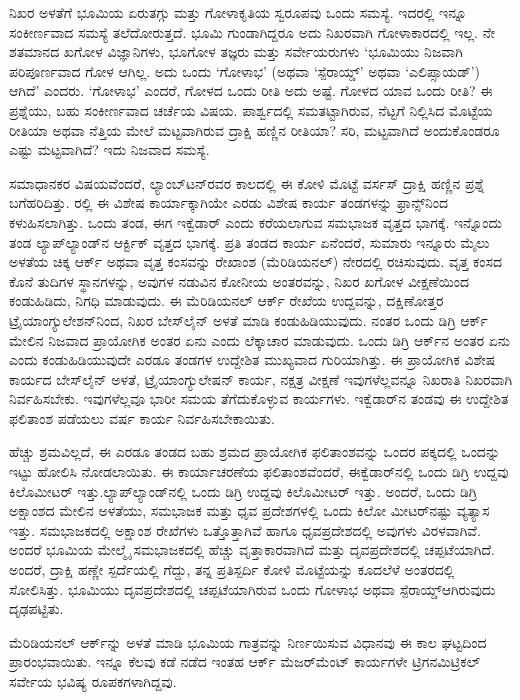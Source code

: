 ನಿಖರ ಅಳತೆಗೆ ಭೂಮಿಯ ಏರುತಗ್ಗು ಮತ್ತು ಗೋಳಾಕೃತಿಯ ಸ್ವರೂಪವು ಒಂದು ಸಮಸ್ಯೆ. ಇದರಲ್ಲಿ ಇನ್ನೂ ಸಂಕೀರ್ಣವಾದ ಸಮಸ್ಯೆ ತಲೆದೋರುತ್ತದೆ. ಭೂಮಿ ಗುಂಡಾಗಿದ್ದರೂ ಅದು ನಿಖರವಾಗಿ ಗೋಳಾಕಾರದಲ್ಲಿ ಇಲ್ಲ. ನೇ ಶತಮಾನದ ಖಗೋಳ ವಿಜ್ಞಾನಿಗಳು, ಭೂಗೋಳ ತಜ್ಞರು ಮತ್ತು ಸರ್ವೇಯರುಗಳು ‘ಭೂಮಿಯು ನಿಜವಾಗಿ ಪರಿಪೂರ್ಣವಾದ ಗೋಳ ಆಗಿಲ್ಲ. ಅದು ಒಂದು ‘ಗೋಳಾಭ’ (ಅಥವಾ ‘ಸ್ಪೆರಾಯ್ಡ್​’ ಅಥವಾ ‘ಎಲಿಪ್ಸಾಯಡ್​’) ಆಗಿದೆ’ ಎಂದರು. ‘ಗೋಳಾಭ’ ಎಂದರೆ, ಗೋಳದ ಒಂದು ರೀತಿ ಅದು ಅಷ್ಟೆ. ಗೋಳದ ಯಾವ ಒಂದು ರೀತಿ? ಈ ಪ್ರಶ್ನೆಯು, ಬಹು ಸಂಕೀರ್ಣವಾದ ಚರ್ಚೆಯ ವಿಷಯ. ಪಾರ್ಶ್ವದಲ್ಲಿ ಸಮತಟ್ಟಾಗಿರುವ, ನೆಟ್ಟಗೆ ನಿಲ್ಲಿಸಿದ ಮೊಟ್ಟೆಯ ರೀತಿಯಾ ಅಥವಾ ನೆತ್ತಿಯ ಮೇಲೆ ಮಟ್ಟವಾಗಿರುವ ದ್ರಾಕ್ಷಿ ಹಣ್ಣಿನ ರೀತಿಯಾ? ಸರಿ, ಮಟ್ಟವಾಗಿದೆ ಅಂದುಕೊಂಡರೂ ಎಷ್ಟು ಮಟ್ಟವಾಗಿದೆ? ಇದು ನಿಜವಾದ ಸಮಸ್ಯೆ.

ಸಮಾಧಾನಕರ ವಿಷಯವೆಂದರೆ, ಲ್ಯಾಂಬ್​ಟನ್​ರವರ ಕಾಲದಲ್ಲಿ ಈ ಕೋಳಿ ಮೊಟ್ಟೆ ವರ್ಸಸ್​ ದ್ರಾಕ್ಷಿ ಹಣ್ಣಿನ ಪ್ರಶ್ನೆ ಬಗೆಹರಿದಿತ್ತು. ರಲ್ಲಿ ಈ ವಿಶೇಷ ಕಾರ್ಯಾಕ್ಕಾಗಿಯೇ ಎರಡು ವಿಶೇಷ ಕಾರ್ಯ ತಂಡಗಳನ್ನು ಫ್ರಾನ್ಸ್​ನಿಂದ ಕಳುಹಿಸಲಾಗಿತ್ತು. ಒಂದು ತಂಡ, ಈಗ ಇಕ್ವೆಡಾರ್​ ಎಂದು ಕರೆಯಲಾಗುವ ಸಮಭಾಜಕ ವೃತ್ತದ ಭಾಗಕ್ಕೆ. ಇನ್ನೊಂದು ತಂಡ ಲ್ಯಾಪ್​ಲ್ಯಾಂಡ್​ನ ಆರ್ಕ್ಟಿಕ್​ ವೃತ್ತದ ಭಾಗಕ್ಕೆ. ಪ್ರತಿ ತಂಡದ ಕಾರ್ಯ ಏನೆಂದರೆ, ಸುಮಾರು ಇನ್ನೂರು ಮೈಲು ಅಳತೆಯ ಚಿಕ್ಕ ಆರ್ಕ್ ಅಥವಾ ವೃತ್ತ ಕಂಸವನ್ನು ರೇಖಾಂಶ (ಮೆರಿಡಿಯನಲ್​) ನೇರದಲ್ಲಿ ರಚಿಸುವುದು. ವೃತ್ತ ಕಂಸದ ಕೊನೆ ತುದಿಗಳ ಸ್ಥಾನಗಳನ್ನು, ಅವುಗಳ ನಡುವಿನ ಕೋನೀಯ ಅಂತರವನ್ನು, ನಿಖರ ಖಗೋಳ ವೀಕ್ಷಣೆಯಿಂದ ಕಂಡುಹಿಡಿದು, ನಿಗಧಿ ಮಾಡುವುದು. ಈ ಮೆರಿಡಿಯನಲ್​ ಆರ್ಕ್ ರೇಖೆಯ ಉದ್ದವನ್ನು, ದಕ್ಷಿಣೋತ್ತರ ಟ್ರೈಯಾಂಗ್ಯುಲೇಶನ್​ನಿಂದ, ನಿಖರ ಬೇಸ್​ಲೈನ್​ ಅಳತೆ ಮಾಡಿ ಕಂಡುಹಿಡಿಯುವುದು. ನಂತರ ಒಂದು ಡಿಗ್ರಿ ಆರ್ಕ್ ಮೇಲಿನ ನಿಜವಾದ ಪ್ರಾಯೋಗಿಕ ಅಂತರ ಏನು ಎಂದು ಲೆಕ್ಕಾಚಾರ ಮಾಡುವುದು. ಒಂದು ಡಿಗ್ರಿ ಆರ್ಕ್‌ನ ಅಂತರ ಏನು ಎಂದು ಕಂಡುಹಿಡಿಯುವುದೇ ಎರಡೂ ತಂಡಗಳ ಉದ್ದೇಶಿತ ಮುಖ್ಯವಾದ ಗುರಿಯಾಗಿತ್ತು. ಈ ಪ್ರಾಯೋಗಿಕ ವಿಶೇಷ ಕಾರ್ಯದ ಬೇಸ್‌ಲೈನ್​ ಅಳತೆ, ಟ್ರೈಯಾಂಗ್ಯುಲೇಷನ್​ ಕಾರ್ಯ, ನಕ್ಷತ್ರ ವೀಕ್ಷಣೆ ಇವುಗಳೆಲ್ಲವನ್ನೂ ನಿಖರಾತಿ ನಿಖರವಾಗಿ ನಿರ್ವಹಿಸಬೇಕು. ಇವುಗಳೆಲ್ಲವೂ ಭಾರೀ ಸಮಯ ತೆಗೆದುಕೊಳ್ಳುವ ಕಾರ್ಯಗಳು. ಇಕ್ವೆಡಾರ್​ನ ತಂಡವು ಈ ಉದ್ದೇಶಿತ ಫಲಿತಾಂಶ ಪಡೆಯಲು  ವರ್ಷ ಕಾರ್ಯ ನಿರ್ವಹಿಸಬೇಕಾಯಿತು.

ಹೆಚ್ಚು ಶ್ರಮವಿಲ್ಲದೆ, ಈ ಎರಡೂ ತಂಡದ ಬಹು ಶ್ರಮದ ಪ್ರಾಯೋಗಿಕ ಫಲಿತಾಂಶವನ್ನು ಒಂದರ ಪಕ್ಕದಲ್ಲಿ ಒಂದನ್ನು ಇಟ್ಟು ಹೋಲಿಸಿ ನೋಡಲಾಯಿತು. ಈ ಕಾರ್ಯಾಚರಣೆಯ ಫಲಿತಾಂಶವೆಂದರೆ, ಈಕ್ವೆಡಾರ್​ನಲ್ಲಿ ಒಂದು ಡಿಗ್ರಿ ಉದ್ದವು  ಕಿಲೊಮೀಟರ್​ ಇತ್ತು.\break ಲ್ಯಾಪ್​ಲ್ಯಾಂಡ್​ನಲ್ಲಿ ಒಂದು ಡಿಗ್ರಿ ಉದ್ದವು  ಕಿಲೊಮೀಟರ್​ ಇತ್ತು. ಅಂದರೆ, ಒಂದು ಡಿಗ್ರಿ ಅಕ್ಷಾಂಶದ ಮೇಲಿನ ಅಳತೆಯು, ಸಮಭಾಜಕ ಮತ್ತು ಧೃವ ಪ್ರದೇಶಗಳಲ್ಲಿ ಒಂದು ಕಿಲೋ ಮೀಟರ್​ನಷ್ಟು ವ್ಯತ್ಯಾಸ ಇತ್ತು. ಸಮಭಾಜಕದಲ್ಲಿ ಅಕ್ಷಾಂಶ ರೇಖೆಗಳು ಒತ್ತೊತ್ತಾಗಿವೆ ಹಾಗೂ ಧೃವಪ್ರದೇಶದಲ್ಲಿ ಅವುಗಳು ವಿರಳವಾಗಿವೆ. ಅಂದರೆ ಭೂಮಿಯ ಮೇಲ್ಮೈ ಸಮಭಾಜಕದಲ್ಲಿ ಹೆಚ್ಚು ವೃತ್ತಾಕಾರವಾಗಿದೆ ಮತ್ತು ದೃವಪ್ರದೇಶದಲ್ಲಿ ಚಪ್ಪಟೆಯಾಗಿದೆ. ಅಂದರೆ, ದ್ರಾಕ್ಷಿ ಹಣ್ಣೇ ಸ್ಪರ್ದೆಯಲ್ಲಿ ಗೆದ್ದು, ತನ್ನ ಪ್ರತಿಸ್ಪರ್ದಿ ಕೋಳಿ ಮೊಟ್ಟೆಯನ್ನು ಕೂದಲೆಳೆ ಅಂತರದಲ್ಲಿ ಸೋಲಿಸಿತ್ತು. ಭೂಮಿಯು ದೃವಪ್ರದೇಶದಲ್ಲಿ ಚಪ್ಪಟೆಯಾಗಿರುವ ಒಂದು ಗೋಳಾಭ ಅಥವಾ ಸ್ಪೆರಾಯ್ಡ್​ ಆಗಿರುವುದು ದೃಢಪಟ್ಟಿತು.

ಮೆರಿಡಿಯನಲ್​ ಆರ್ಕ್‌ನ್ನು ಅಳತೆ ಮಾಡಿ ಭೂಮಿಯ ಗಾತ್ರವನ್ನು ನಿರ್ಣಯಿಸುವ ವಿಧಾನವು ಈ ಕಾಲ ಘಟ್ಟದಿಂದ ಪ್ರಾರಂಭವಾಯಿತು. ಇನ್ನೂ ಕೆಲವು ಕಡೆ ನಡೆದ ಇಂತಹ ಆರ್ಕ್ ಮೆಜರ್​ಮೆಂಟ್​ ಕಾರ್ಯಗಳೇ ಟ್ರಿಗನಮಿಟ್ರಿಕಲ್​ ಸರ್ವೇಯ ಭವಿಷ್ಯ ರೂಪಕಗಳಾಗಿದ್ದವು.

